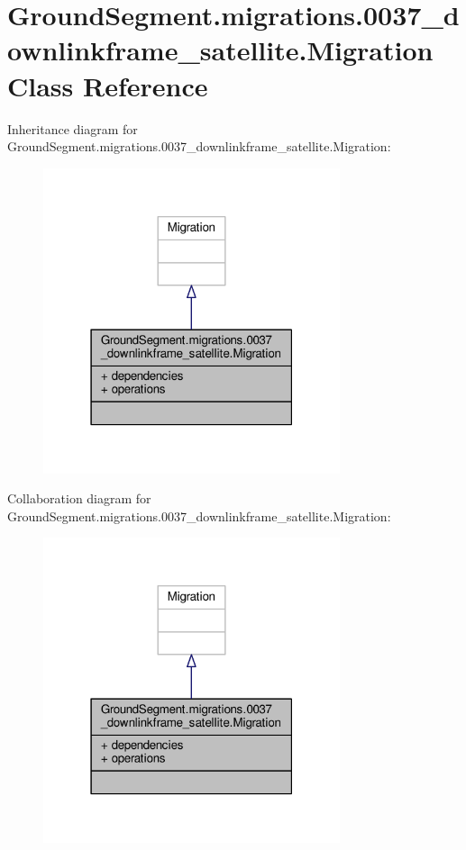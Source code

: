 \hypertarget{class_ground_segment_1_1migrations_1_10037__downlinkframe__satellite_1_1_migration}{}\section{Ground\+Segment.\+migrations.0037\+\_\+downlinkframe\+\_\+satellite.Migration Class Reference}
\label{class_ground_segment_1_1migrations_1_10037__downlinkframe__satellite_1_1_migration}


Inheritance diagram for Ground\+Segment.\+migrations.0037\+\_\+downlinkframe\+\_\+satellite.Migration\+:\nopagebreak
\begin{figure}[H]
\begin{center}
\leavevmode
\includegraphics[width=247pt]{class_ground_segment_1_1migrations_1_10037__downlinkframe__satellite_1_1_migration__inherit__graph}
\end{center}
\end{figure}


Collaboration diagram for Ground\+Segment.\+migrations.0037\+\_\+downlinkframe\+\_\+satellite.Migration\+:\nopagebreak
\begin{figure}[H]
\begin{center}
\leavevmode
\includegraphics[width=247pt]{class_ground_segment_1_1migrations_1_10037__downlinkframe__satellite_1_1_migration__coll__graph}
\end{center}
\end{figure}
